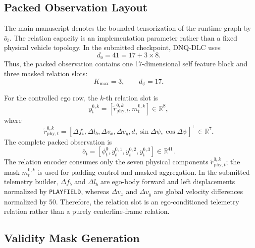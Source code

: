 \documentclass[journal]{IEEEtran}
\begin{document}
\subsection{Packed Observation Layout}
\label{supp:pack}

The main manuscript denotes the bounded tensorization of the runtime
graph by $\bar{o}_t$. The relation capacity is an implementation
parameter rather than a fixed physical vehicle topology. In the
submitted checkpoint, DNQ-DLC uses
\begin{equation}
d_o=41=17+3\times8.
\end{equation}
Thus, the packed observation contains one 17-dimensional self feature
block and three masked relation slots:
\begin{equation}
K_{\max}=3,
\qquad
d_\phi=17.
\end{equation}

For the controlled ego row, the $k$-th relation slot is
\begin{equation}
y_t^{0,k}
=
[
\tilde r_{\mathrm{phy},t}^{0,k},
m_t^{0,k}
]
\in\mathbb{R}^{8},
\end{equation}
where
\begin{equation}
\tilde r_{\mathrm{phy},t}^{0,k}
=
[
\Delta f_b,
\Delta l_b,
\Delta v_x,
\Delta v_y,
d,
\sin\Delta\psi,
\cos\Delta\psi
]^\top
\in\mathbb{R}^{7}.
\end{equation}
The complete packed observation is
\begin{equation}
\bar{o}_t
=
[
\phi_t^0,
y_t^{0,1},
y_t^{0,2},
y_t^{0,3}
]
\in\mathbb{R}^{41}.
\end{equation}
The relation encoder consumes only the seven physical components
$\tilde r_{\mathrm{phy},t}^{0,k}$; the mask $m_t^{0,k}$ is used for
padding control and masked aggregation. In the submitted telemetry
builder, $\Delta f_b$ and $\Delta l_b$ are ego-body forward and left
displacements normalized by \texttt{PLAYFIELD}, whereas
$\Delta v_x$ and $\Delta v_y$ are global velocity differences
normalized by 50. Therefore, the relation slot is an ego-conditioned
telemetry relation rather than a purely centerline-frame relation.

\subsection{Validity Mask Generation}
\label{supp:mask}
\end{document}
